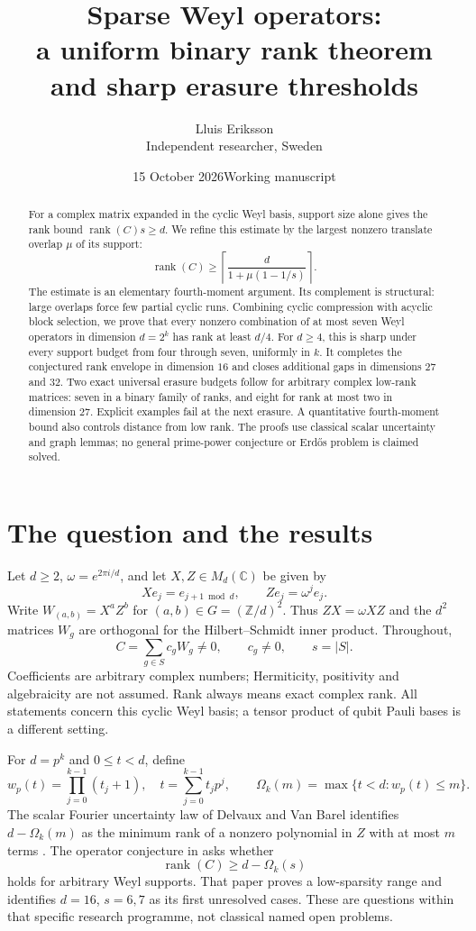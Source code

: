 \documentclass[11pt,a4paper]{article}
\title{Sparse Weyl operators:\\a uniform binary rank theorem\\and sharp erasure thresholds}
\author{Lluis Eriksson\\\small Independent researcher, Sweden}
\date{15 October 2026\quad Working manuscript}
\theoremstyle{remark}\newtheorem{remark}[theorem]{Remark}
\DeclareMathOperator{\rank}{rank}
\newcommand{\Z}{\mathbb Z}
\newcommand{\C}{\mathbb C}
\newcommand{\ceil}[1]{\left\lceil #1\right\rceil}
\begin{document}
\maketitle
\begin{abstract}
For a complex matrix expanded in the cyclic Weyl basis, support size alone gives the rank bound $\rank(C)s\ge d$. We refine this estimate by the largest nonzero translate overlap $\mu$ of its support:
\[
\rank(C)\ge \ceil{\frac{d}{1+\mu(1-1/s)}}.
\]
The estimate is an elementary fourth-moment argument. Its complement is structural: large overlaps force few partial cyclic runs. Combining cyclic compression with acyclic block selection, we prove that every nonzero combination of at most seven Weyl operators in dimension $d=2^k$ has rank at least $d/4$. For $d\ge4$, this is sharp under every support budget from four through seven, uniformly in $k$. It completes the conjectured rank envelope in dimension $16$ and closes additional gaps in dimensions $27$ and $32$. Two exact universal erasure budgets follow for arbitrary complex low-rank matrices: seven in a binary family of ranks, and eight for rank at most two in dimension $27$. Explicit examples fail at the next erasure. A quantitative fourth-moment bound also controls distance from low rank. The proofs use classical scalar uncertainty and graph lemmas; no general prime-power conjecture or Erd\H{o}s problem is claimed solved.
\end{abstract}

\section{The question and the results}
Let $d\ge2$, $\omega=e^{2\pi i/d}$, and let $X,Z\in M_d(\C)$ be given by
\[
 Xe_j=e_{j+1\bmod d},\qquad Ze_j=\omega^j e_j.
\]
Write $W_{(a,b)}=X^aZ^b$ for $(a,b)\in G=(\Z/d)^2$. Thus $ZX=\omega XZ$ and the $d^2$ matrices $W_g$ are orthogonal for the Hilbert--Schmidt inner product. Throughout,
\[
 C=\sum_{g\in S}c_gW_g\ne0,\qquad c_g\ne0,\qquad s=|S|.
\]
Coefficients are arbitrary complex numbers; Hermiticity, positivity and algebraicity are not assumed. Rank always means exact complex rank. All statements concern this cyclic Weyl basis; a tensor product of qubit Pauli bases is a different setting.

For $d=p^k$ and $0\le t<d$, define
\[
 w_p(t)=\prod_{j=0}^{k-1}(t_j+1),\quad t=\sum_{j=0}^{k-1}t_jp^j,
 \qquad \Omega_k(m)=\max\{t<d:w_p(t)\le m\}.
\]
The scalar Fourier uncertainty law of Delvaux and Van Barel identifies $d-\Omega_k(m)$ as the minimum rank of a nonzero polynomial in $Z$ with at most $m$ terms \cite{dvb}. The operator conjecture in \cite{prior} asks whether
\begin{equation}\label{eq:conjecture}
 \rank(C)\ge d-\Omega_k(s)
\end{equation}
holds for arbitrary Weyl supports. That paper proves a low-sparsity range and identifies $d=16$, $s=6,7$ as its first unresolved cases. These are questions within that specific research programme, not classical named open problems.
\end{document}
